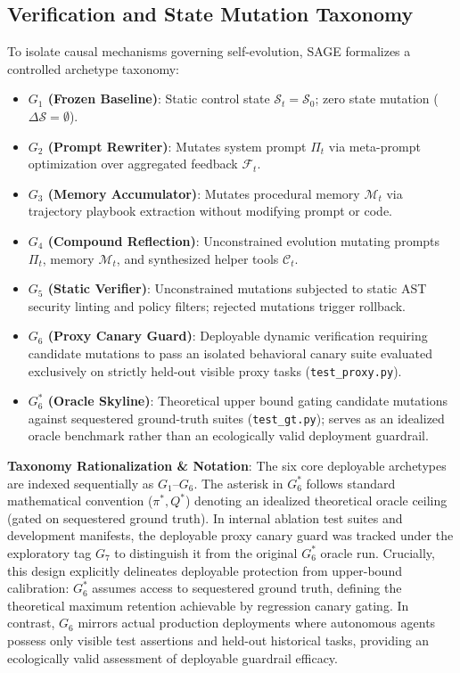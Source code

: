 \documentclass[conference]{IEEEtran}
\begin{document}
\subsection{Verification and State Mutation Taxonomy}
To isolate causal mechanisms governing self-evolution, SAGE formalizes a controlled archetype taxonomy:
\begin{itemize}
    \item \textbf{$G_1$ (Frozen Baseline)}: Static control state $\mathcal{S}_t = \mathcal{S}_0$; zero state mutation ($\Delta \mathcal{S} = \emptyset$).
    \item \textbf{$G_2$ (Prompt Rewriter)}: Mutates system prompt $\Pi_t$ via meta-prompt optimization over aggregated feedback $\mathcal{F}_t$.
    \item \textbf{$G_3$ (Memory Accumulator)}: Mutates procedural memory $\mathcal{M}_t$ via trajectory playbook extraction without modifying prompt or code.
    \item \textbf{$G_4$ (Compound Reflection)}: Unconstrained evolution mutating prompts $\Pi_t$, memory $\mathcal{M}_t$, and synthesized helper tools $\mathcal{C}_t$.
    \item \textbf{$G_5$ (Static Verifier)}: Unconstrained mutations subjected to static AST security linting and policy filters; rejected mutations trigger rollback.
    \item \textbf{$G_6$ (Proxy Canary Guard)}: Deployable dynamic verification requiring candidate mutations to pass an isolated behavioral canary suite evaluated exclusively on strictly held-out visible proxy tasks (\texttt{test\_proxy.py}).
    \item \textbf{$G_6^*$ (Oracle Skyline)}: Theoretical upper bound gating candidate mutations against sequestered ground-truth suites (\texttt{test\_gt.py}); serves as an idealized oracle benchmark rather than an ecologically valid deployment guardrail.
\end{itemize}

\textbf{Taxonomy Rationalization \& Notation}: The six core deployable archetypes are indexed sequentially as $G_1$--$G_6$. The asterisk in $G_6^*$ follows standard mathematical convention ($\pi^*, Q^*$) denoting an idealized theoretical oracle ceiling (gated on sequestered ground truth). In internal ablation test suites and development manifests, the deployable proxy canary guard was tracked under the exploratory tag $G_7$ to distinguish it from the original $G_6^*$ oracle run. Crucially, this design explicitly delineates deployable protection from upper-bound calibration: $G_6^*$ assumes access to sequestered ground truth, defining the theoretical maximum retention achievable by regression canary gating. In contrast, $G_6$ mirrors actual production deployments where autonomous agents possess only visible test assertions and held-out historical tasks, providing an ecologically valid assessment of deployable guardrail efficacy.
\end{document}
